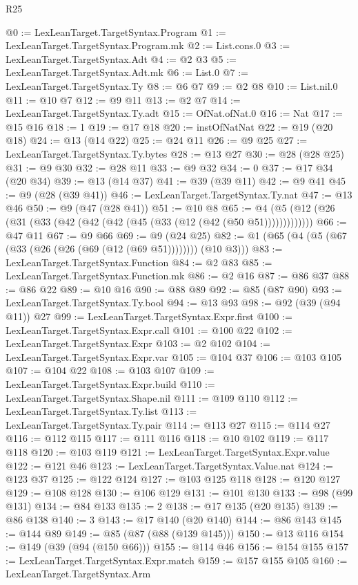 \begin{lexlean}{R25}
\begin{coremodule}
@0 := LexLeanTarget.TargetSyntax.Program
@1 := LexLeanTarget.TargetSyntax.Program.mk
@2 := List.cons.{0}
@3 := LexLeanTarget.TargetSyntax.Adt
@4 := @2 @3
@5 := LexLeanTarget.TargetSyntax.Adt.mk
@6 := List.{0}
@7 := LexLeanTarget.TargetSyntax.Ty
@8 := @6 @7
@9 := @2 @8
@10 := List.nil.{0}
@11 := @10 @7
@12 := @9 @11
@13 := @2 @7
@14 := LexLeanTarget.TargetSyntax.Ty.adt
@15 := OfNat.ofNat.{0}
@16 := Nat
@17 := @15 @16
@18 := 1
@19 := @17 @18
@20 := instOfNatNat
@22 := @19 (@20 @18)
@24 := @13 (@14 @22)
@25 := @24 @11
@26 := @9 @25
@27 := LexLeanTarget.TargetSyntax.Ty.bytes
@28 := @13 @27
@30 := @28 (@28 @25)
@31 := @9 @30
@32 := @28 @11
@33 := @9 @32
@34 := 0
@37 := @17 @34 (@20 @34)
@39 := @13 (@14 @37)
@41 := @39 (@39 @11)
@42 := @9 @41
@45 := @9 (@28 (@39 @41))
@46 := LexLeanTarget.TargetSyntax.Ty.nat
@47 := @13 @46
@50 := @9 (@47 (@28 @41))
@51 := @10 @8
@65 := @4 (@5 (@12 (@26 (@31 (@33 (@42 (@42 (@42 (@45 (@33 (@12 (@42 (@50 @51)))))))))))))
@66 := @47 @11
@67 := @9 @66
@69 := @9 (@24 @25)
@82 := @1 (@65 (@4 (@5 (@67 (@33 (@26 (@26 (@69 (@12 (@69 @51)))))))) (@10 @3)))
@83 := LexLeanTarget.TargetSyntax.Function
@84 := @2 @83
@85 := LexLeanTarget.TargetSyntax.Function.mk
@86 := @2 @16
@87 := @86 @37
@88 := @86 @22
@89 := @10 @16
@90 := @88 @89
@92 := @85 (@87 @90)
@93 := LexLeanTarget.TargetSyntax.Ty.bool
@94 := @13 @93
@98 := @92 (@39 (@94 @11)) @27
@99 := LexLeanTarget.TargetSyntax.Expr.first
@100 := LexLeanTarget.TargetSyntax.Expr.call
@101 := @100 @22
@102 := LexLeanTarget.TargetSyntax.Expr
@103 := @2 @102
@104 := LexLeanTarget.TargetSyntax.Expr.var
@105 := @104 @37
@106 := @103 @105
@107 := @104 @22
@108 := @103 @107
@109 := LexLeanTarget.TargetSyntax.Expr.build
@110 := LexLeanTarget.TargetSyntax.Shape.nil
@111 := @109 @110
@112 := LexLeanTarget.TargetSyntax.Ty.list
@113 := LexLeanTarget.TargetSyntax.Ty.pair
@114 := @113 @27
@115 := @114 @27
@116 := @112 @115
@117 := @111 @116
@118 := @10 @102
@119 := @117 @118
@120 := @103 @119
@121 := LexLeanTarget.TargetSyntax.Expr.value
@122 := @121 @46
@123 := LexLeanTarget.TargetSyntax.Value.nat
@124 := @123 @37
@125 := @122 @124
@127 := @103 @125 @118
@128 := @120 @127
@129 := @108 @128
@130 := @106 @129
@131 := @101 @130
@133 := @98 (@99 @131)
@134 := @84 @133
@135 := 2
@138 := @17 @135 (@20 @135)
@139 := @86 @138
@140 := 3
@143 := @17 @140 (@20 @140)
@144 := @86 @143
@145 := @144 @89
@149 := @85 (@87 (@88 (@139 @145)))
@150 := @13 @116
@154 := @149 (@39 (@94 (@150 @66)))
@155 := @114 @46
@156 := @154 @155
@157 := LexLeanTarget.TargetSyntax.Expr.match
@159 := @157 @155 @105
@160 := LexLeanTarget.TargetSyntax.Arm

\end{coremodule}
\end{lexlean}
